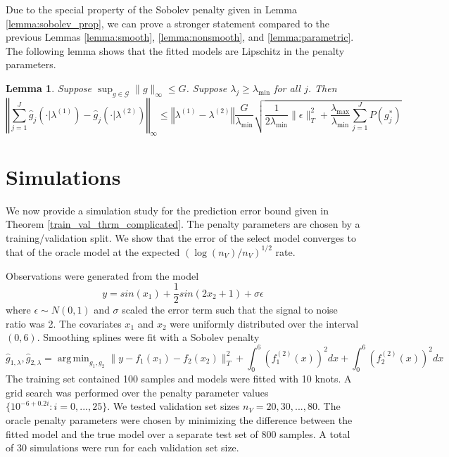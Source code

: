 \documentclass[12pt]{article}
\newtheorem{lemma}{Lemma}
\DeclareMathOperator*{\argmin}{arg\,min}
\begin{document}
Due to the special property of the Sobolev penalty given in Lemma \ref{lemma:sobolev_prop}, we can prove a stronger statement compared to the previous Lemmas \ref{lemma:smooth}, \ref{lemma:nonsmooth}, and \ref{lemma:parametric}. The following lemma shows that the fitted models are Lipschitz in the penalty parameters.

\begin{lemma}
\label{lemma:sobolev}
Suppose $\sup_{g \in \mathcal{G}} \|g\|_\infty \le G$.
Suppose $\lambda_j \ge \lambda_{\min}$ for all $j$.
Then
\begin{equation}
\left\Vert \sum_{j=1}^J \hat{g}_j(\cdot|\lambda^{(1)}) - \hat{g}_j(\cdot|\lambda^{(2)}) \right\Vert _{\infty} 
\le
\left\Vert \lambda^{(1)}-\lambda^{(2)}\right\Vert 
\frac{G}{\lambda_{\min}}
\sqrt{\frac{1}{2\lambda_{\min}}\|\epsilon\|_{T}^{2}
+\frac{\lambda_{\max}}{\lambda_{\min}}\sum_{j=1}^{J}P\left(g_j^{*}\right)}
\end{equation}
\end{lemma}

\section{Simulations}\label{sec:simulations}

We now provide a simulation study for the prediction error bound given in Theorem \ref{train_val_thrm_complicated}. The penalty parameters are chosen by a training/validation split. We show that the error of the select model converges to that of the oracle model at the expected $(\log(n_V)/n_V)^{1/2}$ rate. 

Observations were generated from the model
\begin{equation}
y = sin(x_1) + \frac{1}{2} sin(2 x_2 + 1) + \sigma \epsilon
\end{equation}
where $\epsilon \sim N(0,1)$ and $\sigma$ scaled the error term such that the signal to noise ratio was 2.
The covariates $x_1$ and $x_2$ were uniformly distributed over the interval $(0,6)$.
Smoothing splines were fit with a Sobolev penalty
\begin{equation}
\hat{g}_{1, \lambda}, \hat{g}_{2, \lambda} = \argmin_{g_1, g_2} \| y - f_1(x_1) - f_2(x_2) \|_T^2 + \int_0^6 (f_1^{(2)}(x))^2 dx + \int_0^6 (f_2^{(2)}(x))^2 dx
\end{equation}
The training set contained 100 samples and models were fitted with 10 knots. A grid search was performed over the penalty parameter values $\{10^{-6 + 0.2i}: i = 0, ..., 25 \}$. We tested validation set sizes $n_V = 20, 30, ..., 80$. The oracle penalty parameters were chosen by minimizing the difference between the fitted model and the true model over a separate test set of 800 samples. A total of 30 simulations were run for each validation set size.
\end{document}
